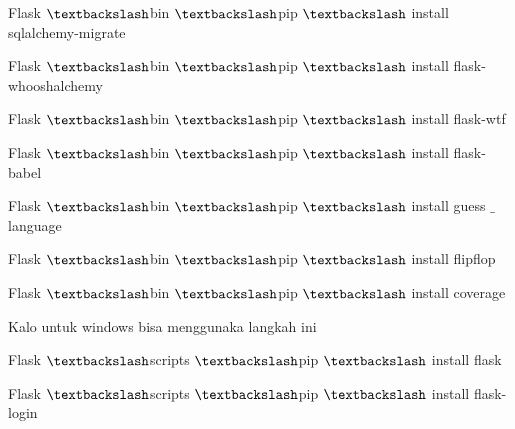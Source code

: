 \vspace{14pt}
\noindent 
{\fontsize{14pt}{14pt}\selectfont Flask $  \textbackslash  $bin $  \textbackslash  $pip $  \textbackslash  $ install sqlalchemy-migrate \\} \par
\vspace{14pt}
\noindent 
{\fontsize{14pt}{14pt}\selectfont Flask $  \textbackslash  $bin $  \textbackslash  $pip $  \textbackslash  $ install flask-whooshalchemy \\} \par
\vspace{14pt}
\noindent 
{\fontsize{14pt}{14pt}\selectfont Flask $  \textbackslash  $bin $  \textbackslash  $pip $  \textbackslash  $ install flask-wtf \\} \par
\vspace{14pt}
\noindent 
{\fontsize{14pt}{14pt}\selectfont Flask $  \textbackslash  $bin $  \textbackslash  $pip $  \textbackslash  $ install flask-babel \\} \par
\vspace{14pt}
\noindent 
{\fontsize{14pt}{14pt}\selectfont Flask $  \textbackslash  $bin $  \textbackslash  $pip $  \textbackslash  $ install guess $  \_  $language \\} \par
\vspace{14pt}
\noindent 
{\fontsize{14pt}{14pt}\selectfont Flask $  \textbackslash  $bin $  \textbackslash  $pip $  \textbackslash  $ install flipflop \\} \par
\vspace{14pt}
\noindent 
{\fontsize{14pt}{14pt}\selectfont Flask $  \textbackslash  $bin $  \textbackslash  $pip $  \textbackslash  $ install coverage \\} \par
\vspace{14pt}
\noindent 
{\fontsize{14pt}{14pt}\selectfont Kalo untuk windows bisa menggunaka langkah ini \\} \par
\vspace{14pt}
\noindent 
{\fontsize{14pt}{14pt}\selectfont Flask $  \textbackslash  $scripts $  \textbackslash  $pip $  \textbackslash  $ install flask \\} \par
\vspace{14pt}
\noindent 
{\fontsize{14pt}{14pt}\selectfont Flask $  \textbackslash  $scripts $  \textbackslash  $pip $  \textbackslash  $ install flask-login \\} \par
